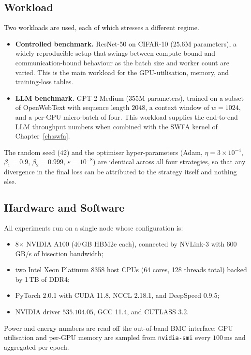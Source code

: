 \subsection{Workload}\label{sec:dist_method_workload}
Two workloads are used, each of which stresses a different regime.
\begin{itemize}
    \item \textbf{Controlled benchmark.} ResNet-50 on CIFAR-10
          ($25.6$M parameters), a widely reproducible setup that
          swings between compute-bound and communication-bound
          behaviour as the batch size and worker count are varied.
          This is the main workload for the GPU-utilisation,
          memory, and training-loss tables.
    \item \textbf{LLM benchmark.} GPT-2 Medium ($355$M parameters),
          trained on a subset of OpenWebText with sequence length
          $2048$, a context window of $w = 1024$, and a per-GPU
          micro-batch of four. This workload supplies the
          end-to-end LLM throughput numbers when combined with the
          SWFA kernel of Chapter~\ref{ch:swfa}.
\end{itemize}
The random seed ($42$) and the optimiser hyper-parameters (Adam,
$\eta = 3 \times 10^{-4}$, $\beta_1 = 0.9$, $\beta_2 = 0.999$,
$\varepsilon = 10^{-8}$) are identical across all four strategies,
so that any divergence in the final loss can be attributed to the
strategy itself and nothing else.

\subsection{Hardware and Software}\label{sec:dist_method_hw}
All experiments run on a single node whose configuration is:
\begin{itemize}
    \item 8$\times$ NVIDIA A100 (40\,GB HBM2e each), connected by
          NVLink-3 with $600$\,GB/s of bisection bandwidth;
    \item two Intel Xeon Platinum 8358 host CPUs
          (64 cores, 128 threads total) backed by 1\,TB of DDR4;
    \item PyTorch 2.0.1 with CUDA 11.8, NCCL 2.18.1, and DeepSpeed
          0.9.5;
    \item NVIDIA driver $535.104.05$, GCC 11.4, and CUTLASS 3.2.
\end{itemize}
Power and energy numbers are read off the out-of-band BMC
interface; GPU utilisation and per-GPU memory are sampled from
\texttt{nvidia-smi} every $100$\,ms and aggregated per epoch.

